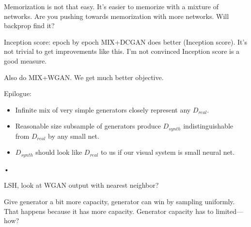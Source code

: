 Memorization is not that easy. It's easier to memorize with a mixture of networks. Are you pushing towards  memorization with more networks. Will backprop find it?

Inception score: epoch by epoch MIX+DCGAN does better (Inception score). It's not trivial to get improvements like this. I'm not convinced Inception score is a good measure. 

Also do MIX+WGAN. We get much better objective.

Epilogue: 
\begin{itemize}
\item
Infinite mix of very simple generators closely represent any $D_{real}$.
\item
Reasonable size subsample of generators produce $D_{synth}$ indistinguishable from $D_{real}$ by any small net.
\item
$D_{synth}$ should look like $D_{real}$ to us if our visual system is small neural net.
\end{itemize}•


LSH, look at WGAN output with nearest neighbor?

Give generator a bit more capacity, generator can win by sampling uniformly. That happens because it has more capacity. Generator capacity has to limited---how? %


